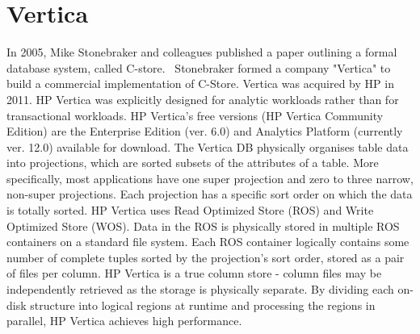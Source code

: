 \section{Vertica}
\label{sec:vertica}

In 2005, Mike Stonebraker and colleagues published a paper
outlining a formal database system, called C-store.~\cite{SABC05} 
Stonebraker formed a company "Vertica" to build a commercial 
implementation of C-Store. Vertica was acquired by HP in 2011.
HP Vertica was explicitly designed for analytic workloads rather than
for transactional workloads. 
HP Vertica’s free versions (HP Vertica Community Edition) are the Enterprise Edition (ver. 6.0) and Analytics Platform (currently ver. 12.0) available for download.
The Vertica DB physically organises table data into projections, which are sorted subsets of the attributes of a table. 
More specifically, most applications have one super projection and zero to three narrow, non-super projections. 
Each projection has a specific sort order on which the data 
is totally sorted. 
HP Vertica uses Read Optimized Store (ROS) and Write Optimized Store (WOS). 
Data in the ROS is physically stored in multiple ROS containers on a standard file system. 
Each ROS container logically contains some number of complete tuples sorted by the projection's sort order, stored as a pair of files per column. 
HP Vertica is a true column store - column files may be independently retrieved as the storage is physically separate. 
By dividing each on-disk structure into logical regions at runtime and processing the regions in parallel, HP Vertica achieves high performance.~\cite{Harr15}